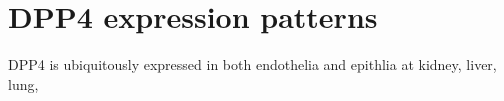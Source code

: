 \section{DPP4 expression patterns}
DPP4 is ubiquitously expressed in both endothelia and epithlia at kidney, liver, lung, 